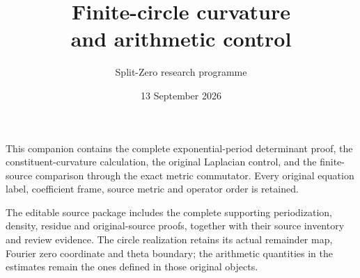 \documentclass[11pt,a4paper]{article}
\title{Finite-circle curvature\\and arithmetic control}
\author{Split-Zero research programme}
\date{13 September 2026}
\begin{document}
\maketitle

This companion contains the complete exponential-period determinant
proof, the constituent-curvature calculation, the original Laplacian
control, and the finite-source comparison through the exact metric
commutator. Every original equation label, coefficient frame, source
metric and operator order is retained.

The editable source package includes the complete supporting
periodization, density, residue and original-source proofs, together
with their source inventory and review evidence. The circle realization
retains its actual remainder map, Fourier zero coordinate and theta
boundary; the arithmetic quantities in the estimates remain the ones
defined in those original objects.

\tableofcontents
\clearpage

\clearpage

\clearpage

\clearpage

\end{document}
